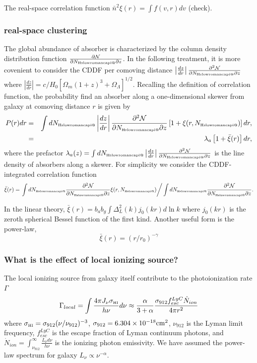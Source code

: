 \documentclass[useAMS,usenatbib,twocolumn]{mn2e}
\makeatletter
\newcommand{\Rmnum}[1]{\expandafter\@slowromancap\romannumeral #1@}
\newcommand{\NHI}{N_{\mbox{\tiny H\Rmnum{1}}}}
\makeatother
\begin{document}
The real-space correlation function $\bar{n}^2\xi(r)=\int f(v,r)dv$ (check).

\subsubsection{real-space clustering}
The global abundance of absorber is characterized by the column density 
distribution function $\frac{\partial\mathcal{N}}{\partial\NHI\partial z}$.
In the following treatment, it is more covenient to consider the 
CDDF per comoving distance $\left|\frac{dz}{dr}\right|
\frac{\partial^2\mathcal{N}}{\partial\NHI \partial z}$ 
where $\left|\frac{dz}{dr}\right|=c/H_0[\Omega_m(1+z)^3+\Omega_\Lambda]^{1/2}$.
Recalling the definition of correlation function, the probability find
an absorber along a one-dimensional skewer from galaxy at comoving distance 
$r$ is given by
\begin{eqnarray}
P(r)dr&=&\int d\NHI\left|\frac{dz}{dr}\right|
\frac{\partial^2\mathcal{N}}{\partial\NHI \partial z}
\left[1+\xi(r,\NHI)\right]dr, \nonumber \\
&=&\lambda_a\left[1+\bar{\xi}(r)\right]dr,
\end{eqnarray}
where the prefactor $\lambda_a(z)=\int d\NHI\left|\frac{dz}{dr}\right|
\frac{\partial^2\mathcal{N}}{\partial\NHI \partial z}$ is the line 
density of absorbers along a skewer. For simplicity we consider the 
CDDF-integrated correlation function 
\begin{equation}
\bar{\xi}(r)=\left.\int d\NHI\frac{\partial^2\mathcal{N}}
{\partial\NHI\partial z}\xi(r,\NHI)\right/
\int d\NHI\frac{\partial^2\mathcal{N}}{\partial\NHI\partial z}.
\end{equation}

In the linear theory, 
$\bar{\xi}(r)=b_a b_g\int\Delta_L^2(k)j_0(kr)d\ln k$
where $j_0(kr)$ is the zeroth spherical Bessel function of the first kind.
Another useful form is the power-law, 
\begin{equation}
\bar{\xi}(r)=(r/r_0)^{-\gamma}
\end{equation}

\subsubsection{What is the effect of local ionizing source?} 
The local ionizing source from galaxy itself contribute to the photoionization
rate $\Gamma$
\begin{equation}
\Gamma_{local}=\int\frac{4\pi J_\nu \sigma_{\mbox{\tiny{HI}}}}{h\nu}d\nu
\approx\frac{\alpha}{3+\alpha}
\frac{\sigma_{912} f_{esc}^{LyC}\dot{N}_{ion}}{4\pi r^2}
\end{equation}
where $\sigma_{\mbox{\tiny{HI}}}=\sigma_{912}(\nu/\nu_{912})^{-3}$,
$\sigma_{912}=6.304\times10^{-18}\rm{cm^2}$, $\nu_{912}$ is the Lyman limit
frequency, $f_{esc}^{LyC}$ is the escape fraction of Lyman continuum photons,
and $\dot{N}_{ion}=\int_{\nu_{912}}^\infty\frac{L_\nu d\nu}{h\nu}$ is
the ionizing photon emissivity. We have assumed the power-law spectrum
for galaxy $L_\nu\propto\nu^{-\alpha}$.
\end{document}
